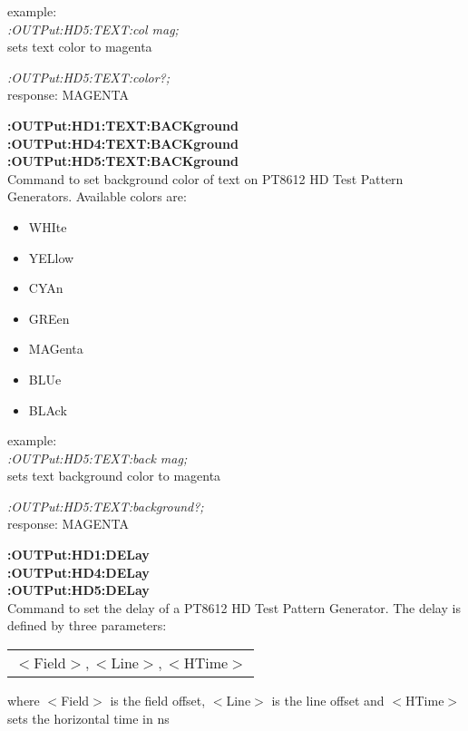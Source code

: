 example:\\
\textit{:OUTPut:HD5:TEXT:col mag;}\\
sets text color to magenta

\textit{:OUTPut:HD5:TEXT:color?;}\\
response: MAGENTA

\textbf{:OUTPut:HD1:TEXT:BACKground}\\
\textbf{:OUTPut:HD4:TEXT:BACKground}\\
\textbf{:OUTPut:HD5:TEXT:BACKground}\\
Command to set background color of text on PT8612 HD Test Pattern Generators. Available colors are:

\begin{itemize}
\item WHIte \\
\item YELlow\\
\item CYAn\\
\item GREen\\
\item MAGenta\\
\item BLUe\\
\item BLAck\\
\end{itemize}

example:\\
\textit{:OUTPut:HD5:TEXT:back mag;}\\
sets text background color to magenta

\textit{:OUTPut:HD5:TEXT:background?;}\\
response: MAGENTA

\textbf{:OUTPut:HD1:DELay}\\
\textbf{:OUTPut:HD4:DELay}\\
\textbf{:OUTPut:HD5:DELay}\\
Command to set the delay of a PT8612 HD Test Pattern Generator. The delay is defined by three parameters:

\begin{tabular}{l}
    $<$Field$>,<$Line$>,<$HTime$>$ \\
\end{tabular}

where $<$Field$>$ is the field offset, $<$Line$>$ is the line offset and $<$HTime$>$ sets the horizontal time in ns

